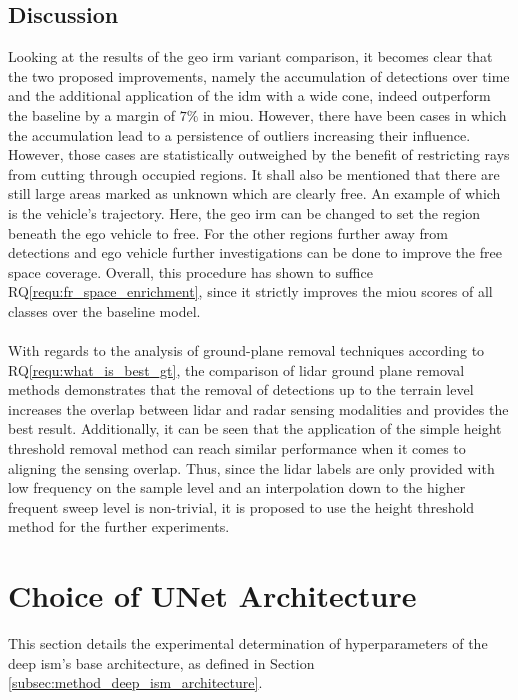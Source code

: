 \subsection{Discussion}
\label{subsec:discussion_gt}
Looking at the results of the geo \gls{irm} variant comparison, it becomes clear that the two proposed improvements, namely the accumulation of detections over time and the additional application of the \gls{idm} with a wide cone, indeed outperform the baseline by a margin of $7\%$ in m\gls{iou}. However, there have been cases in which the accumulation lead to a persistence of outliers increasing their influence. However, those cases are statistically outweighed by the benefit of restricting rays from cutting through occupied regions. It shall also be mentioned that there are still large areas marked as unknown which are clearly free. An example of which is the vehicle's trajectory. Here, the geo \gls{irm} can be changed to set the region beneath the ego vehicle to free. For the other regions further away from detections and ego vehicle further investigations can be done to improve the free space coverage. Overall, this procedure has shown to suffice RQ\ref{requ:fr_space_enrichment}, since it strictly improves the m\gls{iou} scores of all classes over the baseline model.
\\\\
With regards to the analysis of ground-plane removal techniques according to RQ\ref{requ:what_is_best_gt}, the comparison of lidar ground plane removal methods demonstrates that the removal of detections up to the terrain level increases the overlap between lidar and radar sensing modalities and provides the best result. Additionally, it can be seen that the application of the simple height threshold removal method can reach similar performance when it comes to aligning the sensing overlap. Thus, since the lidar labels are only provided with low frequency on the sample level and an interpolation down to the higher frequent sweep level is non-trivial, it is proposed to use the height threshold method for the further experiments. 
%
\section{Choice of UNet Architecture}
\label{sec:choice_of_unet_arch}
This section details the experimental determination of hyperparameters of the deep \gls{ism}'s base architecture, as defined in Section \ref{subsec:method_deep_ism_architecture}.
%
